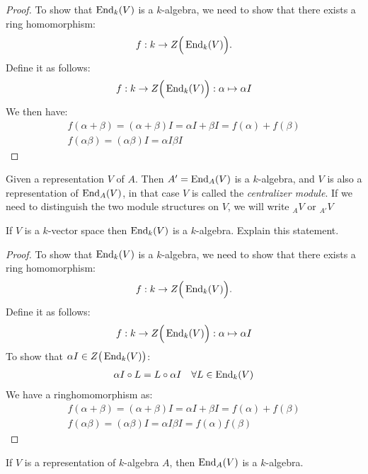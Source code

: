 \begin{proof}
To show that $\operatorname{End}_{k}(V)$ is a $k$-algebra, we need to show that there exists a ring homomorphism:
\[f : k\rightarrow Z\Big(\operatorname{End}_{k}(V)\Big).\]
Define it as follows:
\[f : k\rightarrow Z\Big(\operatorname{End}_{k}(V)\Big) : \alpha  \mapsto  \alpha I\]
We then have:
\begin{gather*}f(\alpha +\beta )=(\alpha +\beta )I=\alpha I+\beta I=f(\alpha )+f(\beta ) \\
f(\alpha \beta )=(\alpha \beta )I=\alpha I\beta I\end{gather*}
\end{proof}

\begin{defn}
Given a representation \(V\) of \(A\). Then \(A'=\operatorname{End}_{A} (V)\) is a \(k\)-algebra, and \(V\) is also a representation of \(\operatorname{End}_{A} (V)\), in that case \(V\) is called the \emph{centralizer module}. If we need to distinguish the two module structures on \(V\), we will write $_{A} V$ or $_{A'} V$

\end{defn}

\begin{prop}
If $V$ is a $k$-vector space then $\operatorname{End}_{k}(V)$ is a $k$-algebra. Explain this statement.
\end{prop}

\begin{proof}
To show that $\operatorname{End}_{k}(V)$ is a $k$-algebra, we need to show that there exists a ring homomorphism:
\[
f : k\rightarrow Z\Big(\operatorname{End}_{k}(V)\Big).
\]
Define it as follows:
\[
f : k\rightarrow Z\Big(\operatorname{End}_{k}(V)\Big) : \alpha  \mapsto  \alpha I
\]
To show that \(\alpha I\in Z\big(\operatorname{End}_{k}(V)\big)\):
\begin{align*}
\alpha I\circ L=L\circ \alpha I &&\forall L\in \operatorname{End}_{k}(V)
\end{align*}
We have a ringhomomorphism as:
\begin{gather*}
f(\alpha +\beta )=(\alpha +\beta )I=\alpha I+\beta I=f(\alpha )+f(\beta ) \\
f(\alpha \beta )=(\alpha \beta )I=\alpha I\beta I=f(\alpha )f(\beta )
\end{gather*}
\end{proof}

\begin{prop}
If $V$ is a representation of \(k\)-algebra \(A\), then \(\operatorname{End}_A(V)\) is a \(k\)-algebra.
\end{prop}

